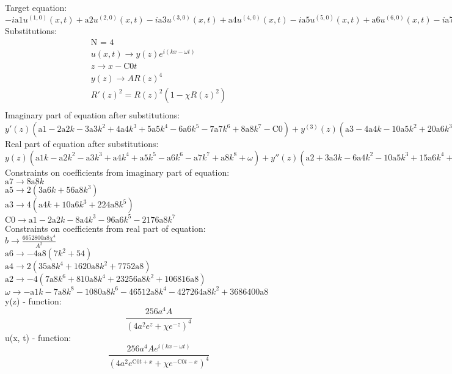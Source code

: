 \documentclass[12pt,a4paper,draft]{article}
\begin{document}
Target equation:
\\$
-i \text{a1} u^{(1,0)}(x,t)+\text{a2} u^{(2,0)}(x,t)-i \text{a3} u^{(3,0)}(x,t)+\text{a4} u^{(4,0)}(x,t)-i \text{a5} u^{(5,0)}(x,t)+\text{a6} u^{(6,0)}(x,t)-i \text{a7} u^{(7,0)}(x,t)+\text{a8} u^{(8,0)}(x,t)-b u(x,t) \left| u(x,t)\right| ^2+i u^{(0,1)}(x,t)=0
$\\
Substitutions:
$$
\begin{array}{c}
 \text{N = 4} \\
 u(x,t)\to y(z) e^{i (k x-\omega  t)} \\
 z\to x-\text{C0} t \\
 y(z)\to A R(z)^4 \\
 R'(z)^2=R(z)^2 \left(1-\chi  R(z)^2\right) \\
\end{array}
$$
Imaginary part of equation after substitutions:
\\$
y'(z) \left(\text{a1}-2 \text{a2} k-3 \text{a3} k^2+4 \text{a4} k^3+5 \text{a5} k^4-6 \text{a6} k^5-7 \text{a7} k^6+8 \text{a8} k^7-\text{C0}\right)+y^{(3)}(z) \left(\text{a3}-4 \text{a4} k-10 \text{a5} k^2+20 \text{a6} k^3+35 \text{a7} k^4-56 \text{a8} k^5\right)+\text{a5} y^{(5)}(z)-6 \text{a6} k y^{(5)}(z)-21 \text{a7} k^2 y^{(5)}(z)+\text{a7} y^{(7)}(z)+56 \text{a8} k^3 y^{(5)}(z)-8 \text{a8} k y^{(7)}(z)=0
$\\
Real part of equation after substitutions:
\\$
y(z) \left(\text{a1} k-\text{a2} k^2-\text{a3} k^3+\text{a4} k^4+\text{a5} k^5-\text{a6} k^6-\text{a7} k^7+\text{a8} k^8+\omega \right)+y''(z) \left(\text{a2}+3 \text{a3} k-6 \text{a4} k^2-10 \text{a5} k^3+15 \text{a6} k^4+21 \text{a7} k^5-28 \text{a8} k^6\right)+\text{a4} y^{(4)}(z)+5 \text{a5} k y^{(4)}(z)-15 \text{a6} k^2 y^{(4)}(z)+\text{a6} y^{(6)}(z)-35 \text{a7} k^3 y^{(4)}(z)+7 \text{a7} k y^{(6)}(z)+70 \text{a8} k^4 y^{(4)}(z)-28 \text{a8} k^2 y^{(6)}(z)+\text{a8} y^{(8)}(z)-b y(z)^3=0
$\\
Constraints on coefficients from imaginary part of equation:
\\$\text{a7}\to 8 \text{a8} k$\\
$\text{a5}\to 2 \left(3 \text{a6} k+56 \text{a8} k^3\right)$\\
$\text{a3}\to 4 \left(\text{a4} k+10 \text{a6} k^3+224 \text{a8} k^5\right)$\\
$\text{C0}\to \text{a1}-2 \text{a2} k-8 \text{a4} k^3-96 \text{a6} k^5-2176 \text{a8} k^7$\\
Constraints on coefficients from real part of equation:
\\$b\to \frac{6652800 \text{a8} \chi ^4}{A^2}$\\
$\text{a6}\to -4 \text{a8} \left(7 k^2+54\right)$\\
$\text{a4}\to 2 \left(35 \text{a8} k^4+1620 \text{a8} k^2+7752 \text{a8}\right)$\\
$\text{a2}\to -4 \left(7 \text{a8} k^6+810 \text{a8} k^4+23256 \text{a8} k^2+106816 \text{a8}\right)$\\
$\omega \to -\text{a1} k-7 \text{a8} k^8-1080 \text{a8} k^6-46512 \text{a8} k^4-427264 \text{a8} k^2+3686400 \text{a8}$\\


y(z) - function:
$$
\frac{256 a^4 A}{\left(4 a^2 e^z+\chi  e^{-z}\right)^4}
$$
u(x, t) - function:
$$
\frac{256 a^4 A e^{i (k x-\omega  t)}}{\left(4 a^2 e^{\text{C0} t+x}+\chi  e^{-\text{C0} t-x}\right)^4}
$$
\end{document}
